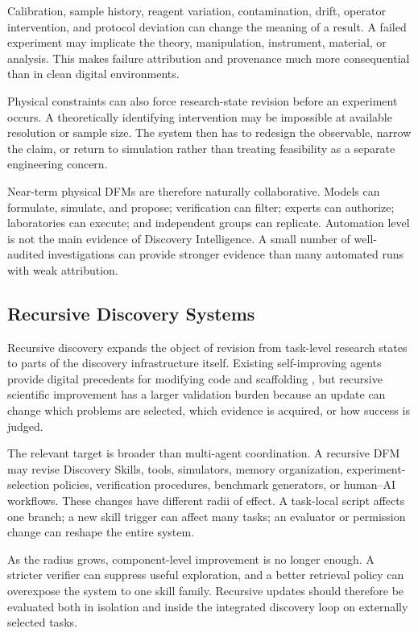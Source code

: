 \documentclass[11pt, a4paper, copyright]{google}
\begin{document}
Calibration, sample history, reagent variation, contamination, drift, operator intervention, and protocol deviation can change the meaning of a result. A failed experiment may implicate the theory, manipulation, instrument, material, or analysis. This makes failure attribution and provenance much more consequential than in clean digital environments.

Physical constraints can also force research-state revision before an experiment occurs. A theoretically identifying intervention may be impossible at available resolution or sample size. The system then has to redesign the observable, narrow the claim, or return to simulation rather than treating feasibility as a separate engineering concern.

Near-term physical DFMs are therefore naturally collaborative. Models can formulate, simulate, and propose; verification can filter; experts can authorize; laboratories can execute; and independent groups can replicate. Automation level is not the main evidence of Discovery Intelligence. A small number of well-audited investigations can provide stronger evidence than many automated runs with weak attribution.

\subsection{Recursive Discovery Systems}
\label{subsec:recursive-discovery}

Recursive discovery expands the object of revision from task-level research states to parts of the discovery infrastructure itself. Existing self-improving agents provide digital precedents for modifying code and scaffolding \citep{yin2025godelagent,zhang2025darwingodel}, but recursive scientific improvement has a larger validation burden because an update can change which problems are selected, which evidence is acquired, or how success is judged.

The relevant target is broader than multi-agent coordination. A recursive DFM may revise Discovery Skills, tools, simulators, memory organization, experiment-selection policies, verification procedures, benchmark generators, or human--AI workflows. These changes have different radii of effect. A task-local script affects one branch; a new skill trigger can affect many tasks; an evaluator or permission change can reshape the entire system.

As the radius grows, component-level improvement is no longer enough. A stricter verifier can suppress useful exploration, and a better retrieval policy can overexpose the system to one skill family. Recursive updates should therefore be evaluated both in isolation and inside the integrated discovery loop on externally selected tasks.
\end{document}
